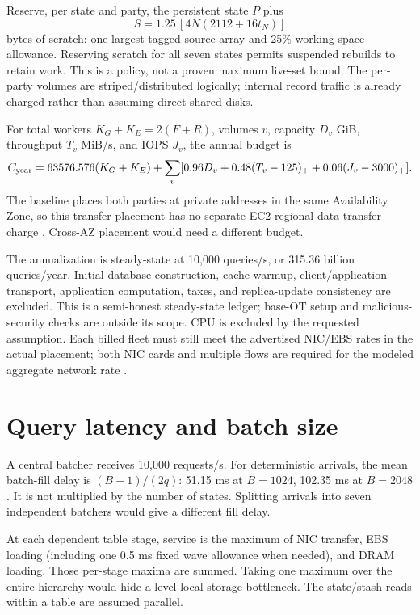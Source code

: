 \documentclass[11pt]{article}
\begin{document}
Reserve, per state and party, the persistent state $P$ plus
\[
 S=1.25\,[4N(2112+16t_N)]
\]
bytes of scratch: one largest tagged source array and 25\% working-space
allowance. Reserving scratch for all seven states permits suspended
rebuilds to retain work. This is a policy, not a proven maximum live-set
bound. The per-party volumes are striped/distributed logically; internal
record traffic is already charged rather than assuming direct shared disks.

For total workers $K_G+K_E=2(F+R)$, volumes $v$, capacity $D_v$ GiB,
throughput $T_v$ MiB/s, and IOPS $J_v$, the annual budget is
\[
 C_{\rm year}=63576.576(K_G+K_E)+
 \sum_v[0.96D_v+0.48(T_v-125)_++0.06(J_v-3000)_+].
\]
The baseline places both parties at private addresses in the same Availability Zone, so this
transfer placement has no separate EC2 regional data-transfer charge
\cite{aws-transfer}. Cross-AZ placement would need a different budget.



The annualization is steady-state at 10,000 queries/s, or 315.36 billion
queries/year. Initial database construction, cache warmup, client/application
transport, application computation, taxes, and replica-update consistency
are excluded. This is a semi-honest steady-state ledger; base-OT setup and
malicious-security checks are outside its scope. CPU is excluded by the
requested assumption. Each billed
fleet must still meet the advertised NIC/EBS rates in the actual placement;
both NIC cards and multiple flows are required for the modeled aggregate
network rate \cite{aws-network}.

\section{Query latency and batch size}
A central batcher receives 10,000 requests/s. For deterministic arrivals,
the mean batch-fill delay is $(B-1)/(2q)$: 51.15 ms at $B=1024$, 102.35 ms
at $B=2048$. It is not multiplied by the number of states. Splitting arrivals
into seven independent batchers would give a different fill delay.

At each dependent table stage, service is the maximum of NIC transfer,
EBS loading (including one 0.5 ms fixed wave allowance when needed), and
DRAM loading. Those per-stage maxima are summed. Taking one maximum over
the entire hierarchy would hide a level-local storage bottleneck. The
state/stash reads within a table are assumed parallel.
\end{document}
